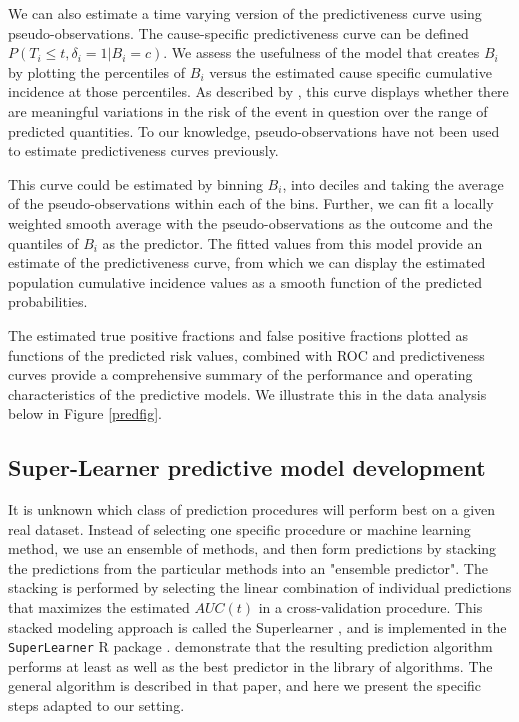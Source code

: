\documentclass{statsoc}
\begin{document}
We can also estimate a time varying version of the predictiveness curve \citep{pepe2007integrating} using pseudo-observations. The cause-specific predictiveness curve can be defined $P(T_i \leq t, \delta_i = 1 | B_i = c).$ We assess the usefulness of the model that creates $B_i$ by plotting the percentiles of $B_i$ versus the estimated cause specific cumulative incidence at those percentiles. As described by \citet{pepe2007integrating}, this curve displays whether there are meaningful variations in the risk of the event in question over the range of predicted quantities. To our knowledge, pseudo-observations have not been used to estimate predictiveness curves previously. 

This curve could be estimated by binning $B_i$, into deciles and taking the average of the pseudo-observations within each of the bins. Further, we can fit a locally weighted smooth average with the pseudo-observations as the outcome and the quantiles of $B_i$ as the predictor. The fitted values from this model provide an estimate of the predictiveness curve, from which we can display the estimated population cumulative incidence values as a smooth function of the predicted probabilities. 

The estimated true positive fractions and false positive fractions plotted as functions of the predicted risk values, combined with ROC and predictiveness curves provide a comprehensive summary of the performance and operating characteristics of the predictive models. We illustrate this in the data analysis below in Figure \ref{predfig}. 

\subsection{Super-Learner predictive model development}

It is unknown which class of prediction procedures will perform best on a given real dataset. Instead of selecting one specific procedure or machine learning method, we use an ensemble of methods, and then form predictions by stacking the predictions from the particular methods into an "ensemble predictor". The stacking is performed by selecting the linear combination of individual predictions that maximizes the estimated $AUC(t)$ in a cross-validation procedure. This stacked modeling approach is called the Superlearner \citep{van2007super}, and is implemented in the \texttt{SuperLearner} R package \citep{superlearner}. \citet{van2007super} demonstrate that the resulting prediction algorithm performs at least as well as the best predictor in the library of algorithms. The general algorithm is described in that paper, and here we present the specific steps adapted to our setting.
\end{document}
